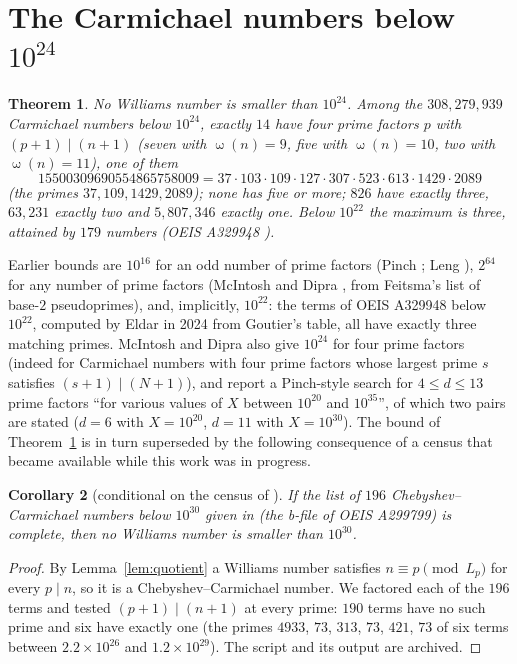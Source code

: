 \documentclass[11pt]{amsart}
\newtheorem{theorem}{Theorem}[section]
\newtheorem{corollary}[theorem]{Corollary}
\theoremstyle{definition}
\theoremstyle{remark}
\DeclareMathOperator{\omg}{\omega}
\begin{document}
\section{The Carmichael numbers below \texorpdfstring{$10^{24}$}{10\^{}24}}\label{sec:bound}

\begin{theorem}\label{thm:bound}
No Williams number is smaller than $10^{24}$. Among the $308{,}279{,}939$ Carmichael numbers below $10^{24}$, exactly $14$ have four prime factors $p$ with $(p+1)\mid(n+1)$ (seven with $\omg(n)=9$, five with $\omg(n)=10$, two with $\omg(n)=11$), one of them
\[
15500309690554865758009=37\cdot103\cdot109\cdot127\cdot307\cdot523\cdot613\cdot1429\cdot2089
\]
(the primes $37,109,1429,2089$); none has five or more; $826$ have exactly three, $63{,}231$ exactly two and $5{,}807{,}346$ exactly one. Below $10^{22}$ the maximum is three, attained by $179$ numbers (OEIS A329948 \cite{OEIS}).
\end{theorem}

Earlier bounds are $10^{16}$ for an odd number of prime factors (Pinch \cite{Pinch07}; Leng \cite{Leng17}), $2^{64}$ for any number of prime factors (McIntosh and Dipra \cite{MD15}, from Feitsma's list of base-$2$ pseudoprimes), and, implicitly, $10^{22}$: the terms of OEIS A329948 below $10^{22}$, computed by Eldar in 2024 from Goutier's table, all have exactly three matching primes. McIntosh and Dipra also give $10^{24}$ for four prime factors (indeed for Carmichael numbers with four prime factors whose largest prime $s$ satisfies $(s+1)\mid(N+1)$), and report a Pinch-style search for $4\le d\le13$ prime factors ``for various values of $X$ between $10^{20}$ and $10^{35}$'', of which two pairs are stated ($d=6$ with $X=10^{20}$, $d=11$ with $X=10^{30}$). The bound of Theorem~\ref{thm:bound} is in turn superseded by the following consequence of a census that became available while this work was in progress.

\begin{corollary}[conditional on the census of \cite{Pud30}]\label{cor:census}
If the list of $196$ Chebyshev--Carmichael numbers below $10^{30}$ given in \cite{Pud30} (the b-file of OEIS A299799) is complete, then no Williams number is smaller than $10^{30}$.
\end{corollary}
\begin{proof}
By Lemma~\ref{lem:quotient} a Williams number satisfies $n\equiv p\pmod{L_p}$ for every $p\mid n$, so it is a Chebyshev--Carmichael number. We factored each of the $196$ terms and tested $(p+1)\mid(n+1)$ at every prime: $190$ terms have no such prime and six have exactly one (the primes $4933$, $73$, $313$, $73$, $421$, $73$ of six terms between $2.2\times10^{26}$ and $1.2\times10^{29}$). The script and its output are archived.
\end{proof}
\end{document}
